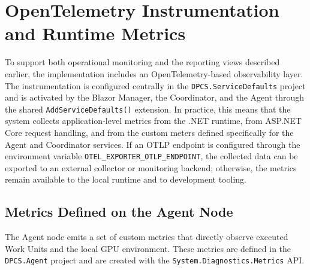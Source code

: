 \section{OpenTelemetry Instrumentation and Runtime Metrics}

To support both operational monitoring and the reporting views described earlier, the implementation includes an OpenTelemetry-based observability layer. The instrumentation is configured centrally in the \verb|DPCS.ServiceDefaults| project and is activated by the Blazor Manager, the Coordinator, and the Agent through the shared \verb|AddServiceDefaults()| extension. In practice, this means that the system collects application-level metrics from the .NET runtime, from ASP.NET Core request handling, and from the custom meters defined specifically for the Agent and Coordinator services. If an OTLP endpoint is configured through the environment variable \verb|OTEL_EXPORTER_OTLP_ENDPOINT|, the collected data can be exported to an external collector or monitoring backend; otherwise, the metrics remain available to the local runtime and to development tooling.

\subsection{Metrics Defined on the Agent Node}

The Agent node emits a set of custom metrics that directly observe executed Work Units and the local GPU environment. These metrics are defined in the \verb|DPCS.Agent| project and are created with the \verb|System.Diagnostics.Metrics| API.

